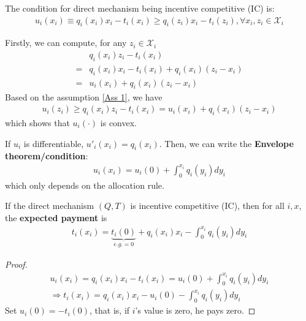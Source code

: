 \documentclass[11pt]{elegantbook}
\begin{document}
\begin{assumption}
    The condition for direct mechanism being incentive competitive (IC) is:
    \begin{equation}
        \begin{aligned}
            u_i(x_i)\equiv q_i(x_i) x_i - t_i(x_i)\geq q_i(z_i) x_i - t_i(z_i), \forall x_i, z_i\in \mathcal{X}_i
        \end{aligned}
        \tag{Ass 1}
        \label{Ass 1}
    \end{equation}
\end{assumption}


Firstly, we can compute, for any $z_i\in \mathcal{X}_i$
\begin{equation}
    \begin{aligned}
        &q_i(x_i)z_i-t_i(x_i)\\
        =&q_i(x_i)x_i-t_i(x_i)+q_i(x_i)(z_i-x_i)\\
        =&u_i(x_i)+q_i(x_i)(z_i-x_i)
    \end{aligned}
    \nonumber
\end{equation}
Based on the assumption \ref{Ass 1}, we have
\begin{equation}
    \begin{aligned}
        u_i(z_i)\geq q_i(x_i)z_i-t_i(x_i)=u_i(x_i)+q_i(x_i)(z_i-x_i)
    \end{aligned}
    \nonumber
\end{equation}
which shows that $u_i(\cdot)$ is convex.

If $u_i$ is differentiable, $u'_i(x_i)=q_i(x_i)$. Then, we can write the \textbf{Envelope theorem/condition}:
\begin{equation}
    \begin{aligned}
        u_i(x_i)=u_i(0)+\int_0^{x_i} q_i(y_i)dy_i
    \end{aligned}
    \nonumber
\end{equation}
which only depends on the allocation rule.

\begin{theorem}
    If the direct mechanism $(Q,T)$ is incentive competitive (IC), then for all $i,x$, the \textbf{expected payment} is
    \begin{equation}
        \begin{aligned}
            t_i(x_i)=\underbrace{t_i(0)}_{e.g.=0}+q_i(x_i)x_i-\int_0^{x_i} q_i(y_i)dy_i
        \end{aligned}
        \nonumber
    \end{equation}
\end{theorem}
\begin{proof}
    \begin{equation}
        \begin{aligned}
            u_i(x_i)= q_i(x_i) x_i - t_i(x_i)=u_i(0)+\int_0^{x_i} q_i(y_i)dy_i\\
            \Rightarrow t_i(x_i)=q_i(x_i)x_i-u_i(0)-\int_0^{x_i} q_i(y_i)dy_i
        \end{aligned}
        \nonumber
    \end{equation}
    Set $u_i(0)=-t_i(0)$, that is, if $i$'s value is zero, he pays zero.
\end{proof}
\end{document}
